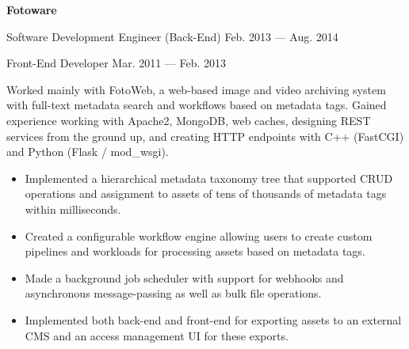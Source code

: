 \parbox[t][][t]{\linewidth}{
	\parbox{\linewidth}{\textbf{Fotoware}}
	\smallbreak
	\smallskip
	{\hfill\parbox{\linewidth}{
		\parbox{\linewidth}{
			{Software Development Engineer (Back-End)}
			\hfill
			{Feb. 2013 --- Aug. 2014}
		}
		\smallbreak
		\parbox{\linewidth}{
			{Front-End Developer}
			\hfill
			{Mar. 2011 --- Feb. 2013}
		}
	}}
		

	\bigskip
	Worked mainly with FotoWeb, a web-based image and video
	archiving system with full-text metadata search and workflows based on
	metadata tags. Gained experience working with Apache2, MongoDB, web
	caches, designing REST services from the ground up, and creating HTTP endpoints with C++ (FastCGI)
	and Python (Flask / mod\_wsgi).

	\bigskip
	\begin{itemize}
		\item{Implemented a hierarchical metadata taxonomy tree that
			supported CRUD operations and assignment to assets of tens of thousands of metadata tags within
			milliseconds.}\\[-.6em]
		\item{Created a configurable workflow engine allowing users to
			create custom pipelines and workloads for processing assets based on
			metadata tags.}\\[-.6em]
		\item{Made a background job scheduler with support for
			webhooks and asynchronous message-passing as well as
			bulk file operations.}\\[-.6em]
		\item{Implemented both back-end and front-end for exporting
			assets to an external CMS and an access 
			management UI for these exports.}\\[-.6em]
	\end{itemize}
}
